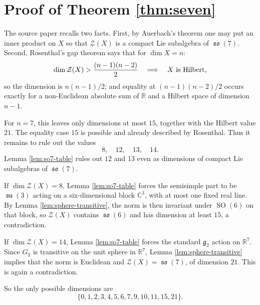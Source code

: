 \documentclass[11pt]{article}
\DeclareMathOperator{\SO}{SO}
\DeclareMathOperator{\so}{\mathfrak{so}}
\DeclareMathOperator{\su}{\mathfrak{su}}
\begin{document}
\section*{Proof of Theorem \ref{thm:seven}}

The source paper recalls two facts. First, by Auerbach's theorem one may put
an inner product on $X$ so that $\mathcal Z(X)$ is a compact Lie subalgebra
of $\so(7)$. Second, Rosenthal's gap theorem says that for
$\dim X=n$:
\[
\dim\mathcal Z(X)>\frac{(n-1)(n-2)}2
\quad\Longrightarrow\quad
X\hbox{ is Hilbert,}
\]
so the dimension is $n(n-1)/2$; and equality at
$(n-1)(n-2)/2$ occurs exactly for a non-Euclidean absolute sum of
$\mathbb R$ and a Hilbert space of dimension $n-1$.

For $n=7$, this leaves only dimensions at most $15$, together with the
Hilbert value $21$. The equality case $15$ is possible and already described
by Rosenthal. Thus it remains to rule out the values
\[
8,\quad 12,\quad 13,\quad 14.
\]
Lemma \ref{lem:so7-table} rules out $12$ and $13$ even as dimensions of
compact Lie subalgebras of $\so(7)$.

If $\dim\mathcal Z(X)=8$, Lemma \ref{lem:so7-table} forces the semisimple
part to be $\su(3)$ acting on a six-dimensional block $\mathbb C^3$, with at
most one fixed real line. By Lemma \ref{lem:sphere-transitive}, the norm is
then invariant under $\SO(6)$ on that block, so $\mathcal Z(X)$ contains
$\so(6)$ and has dimension at least $15$, a contradiction.

If $\dim\mathcal Z(X)=14$, Lemma \ref{lem:so7-table} forces the standard
$\mathfrak g_2$ action on $\mathbb R^7$. Since $G_2$ is transitive on the
unit sphere in $\mathbb R^7$, Lemma \ref{lem:sphere-transitive} implies that
the norm is Euclidean and $\mathcal Z(X)=\so(7)$, of dimension $21$. This is
again a contradiction.

So the only possible dimensions are
\[
\{0,1,2,3,4,5,6,7,9,10,11,15,21\}.
\]
\end{document}
